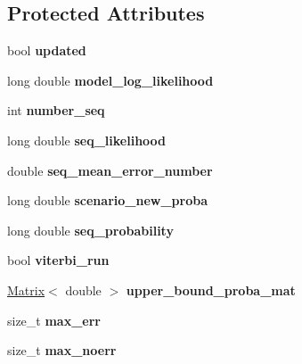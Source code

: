 \subsection*{Protected Attributes}
\begin{DoxyCompactItemize}
\item 
\mbox{\label{classError__rate_ad65514e6bef52d765159276d8c2e4555}} 
bool {\bfseries updated}
\item 
\mbox{\label{classError__rate_a88fbd252630f486e1eb9ae76c8d97205}} 
long double {\bfseries model\+\_\+log\+\_\+likelihood}
\item 
\mbox{\label{classError__rate_a8ab2a2ff3e951d38f7775bcbad794c53}} 
int {\bfseries number\+\_\+seq}
\item 
\mbox{\label{classError__rate_acb4948fe7aedc104a1e36a21a544f7c2}} 
long double {\bfseries seq\+\_\+likelihood}
\item 
\mbox{\label{classError__rate_aeb1808d4631732d10ad921075da48a2a}} 
double {\bfseries seq\+\_\+mean\+\_\+error\+\_\+number}
\item 
\mbox{\label{classError__rate_a66750e4559780ed2c0f38f30761494c5}} 
long double {\bfseries scenario\+\_\+new\+\_\+proba}
\item 
\mbox{\label{classError__rate_ad5c94788f8932da10e863b677644277e}} 
long double {\bfseries seq\+\_\+probability}
\item 
\mbox{\label{classError__rate_a37803a110ad032624ad5b528290a6d01}} 
bool {\bfseries viterbi\+\_\+run}
\item 
\mbox{\label{classError__rate_a4690df19a431a3b3de07173117ad9cba}} 
\hyperlink{structMatrix}{Matrix}$<$ double $>$ {\bfseries upper\+\_\+bound\+\_\+proba\+\_\+mat}
\item 
\mbox{\label{classError__rate_a8081ac69bdf77964721cccf034bb8752}} 
size\+\_\+t {\bfseries max\+\_\+err}
\item 
\mbox{\label{classError__rate_adcf9e8c4fa714b05bf025ccd0bada2a5}} 
size\+\_\+t {\bfseries max\+\_\+noerr}
\end{DoxyCompactItemize}


